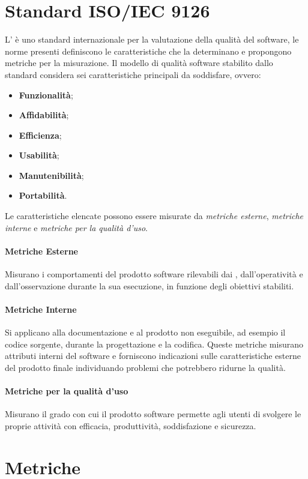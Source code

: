 \newpage
\section{Standard ISO/IEC 9126}\label{9126}
L' è uno standard internazionale per la valutazione della qualità del software, le norme presenti definiscono le caratteristiche che la determinano e propongono metriche per la misurazione.
Il modello di qualità software stabilito dallo standard considera sei caratteristiche principali da soddisfare, ovvero:
\begin{itemize}
	\item \textbf{Funzionalità};
	\item \textbf{Affidabilità};
	\item \textbf{Efficienza};
	\item \textbf{Usabilità};
	\item \textbf{Manutenibilità};
	\item \textbf{Portabilità}.
\end{itemize}
Le caratteristiche elencate possono essere misurate da \textit{metriche esterne}, \textit{metriche interne} e \textit{metriche per la qualità d'uso}.
\paragraph*{Metriche Esterne}
Misurano i comportamenti del prodotto software rilevabili dai , dall'operatività e dall'osservazione durante la sua esecuzione, in funzione degli obiettivi stabiliti. 
\paragraph*{Metriche Interne}
Si applicano alla documentazione e al prodotto non eseguibile, ad esempio il codice sorgente, durante la progettazione e la codifica. Queste metriche misurano attributi interni del software e forniscono indicazioni sulle caratteristiche esterne del prodotto finale individuando problemi che potrebbero ridurne la qualità.
\paragraph*{Metriche per la qualità d'uso}
Misurano il grado con cui il prodotto software permette agli utenti di svolgere le proprie attività con efficacia, produttività, soddisfazione e sicurezza.

\section{Metriche} \label{Metriche}
